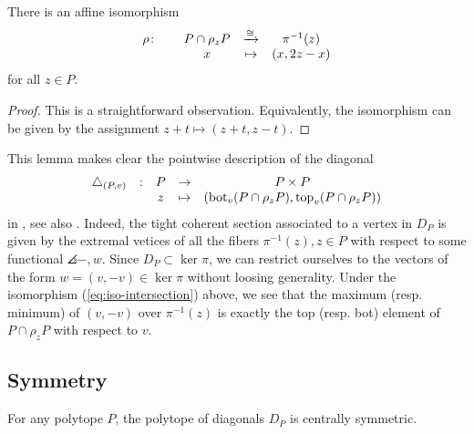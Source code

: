 \begin{lemma}
	There is an affine isomorphism
	\begin{equation} \label{eq:iso-intersection}
		\begin{matrix}
			\rho \colon & & P \cap \rho_z P & \xrightarrow{\cong} & \pi^{-1}(z) \\
			& & x  & \mapsto & (x,2z-x)
		\end{matrix}
	\end{equation}
	for all $z \in P$.
\end{lemma}

\begin{proof}
	This is a straightforward observation.
	Equivalently, the isomorphism can be given by the assignment $z+t \mapsto (z+t,z-t)$.
\end{proof}

This lemma makes clear the pointwise description of the diagonal
\begin{equation*}
	\begin{matrix}
		\triangle_{(P,v)} & : & P & \to & P \times P \\
		& & z  & \mapsto & (\operatorname{bot}_v(P \cap \rho_z P),\operatorname{top}_v(P \cap \rho_z P))
	\end{matrix}
\end{equation*}
in \cite[Definition 10]{MTTV19}, see also \cite[Proposition 1.15]{GLA21}.
Indeed, the tight coherent section associated to a vertex in $D_P$ is given by the extremal vetices of all the fibers $\pi^{-1}(z), z \in P$ with respect to some functional $\angles{-,w}$.
Since $D_P \subset \ker \pi$, we can restrict ourselves to the vectors of the form $w=(v,-v) \in \ker \pi$ without loosing generality.
Under the isomorphism (\ref{eq:iso-intersection}) above, we see that the maximum (resp. minimum) of $(v,-v)$ over $\pi^{-1}(z)$ is exactly the top (resp. bot) element of $P\cap \rho_z P$ with respect to $v$.

\subsection{Symmetry}

\begin{lemma}
	For any polytope $P$, the polytope of diagonals $D_P$ is centrally symmetric.
\end{lemma}

